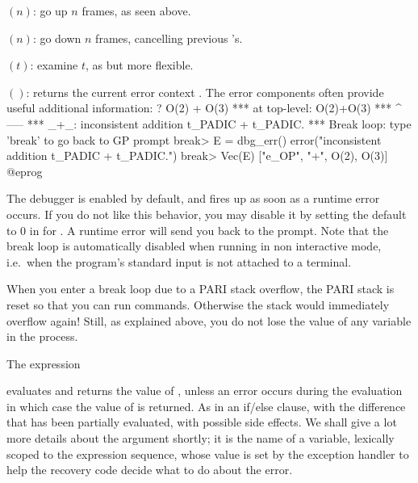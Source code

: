 $(n)$: go up $n$ frames, as seen above.

$(n)$: go down $n$ frames, cancelling previous 's.

$(t)$: examine $t$, as  but more flexible.

$()$: returns the current error context . The error
 components often provide useful additional information:
\bprog
  ? O(2) + O(3)
    ***   at top-level: O(2)+O(3)
    ***                     ^-----
    *** _+_: inconsistent addition t_PADIC + t_PADIC.
    ***   Break loop: type 'break' to go back to GP prompt
  break> E = dbg_err()
  error("inconsistent addition t_PADIC + t_PADIC.")
  break> Vec(E)
  ["e_OP", "+", O(2), O(3)]
@eprog

 The debugger is enabled by default, and fires up as soon as
a runtime error occurs. If you do not like this behavior, you may disable it by
setting the default  to 0 in for . A runtime error
will send you back to the prompt. Note that the break loop is automatically
disabled when running  in non interactive mode, i.e.~when the program's
standard input is not attached to a terminal.

 When you enter a break loop due to a PARI stack
overflow, the PARI stack is reset so that you can run commands. Otherwise the
stack would immediately overflow again! Still, as explained above, you do not
lose the value of any  variable in the process.

The expression


\noindent evaluates and returns the value of , unless an
error occurs during the evaluation in which case the value of 
is returned. As in an if/else clause, with the difference that
 has been partially evaluated, with possible side effects.
We shall give a lot more details about the  argument shortly; it is
the name of a variable, lexically scoped to the  expression
sequence, whose value is set by the exception handler to help the recovery
code decide what to do about the error.

